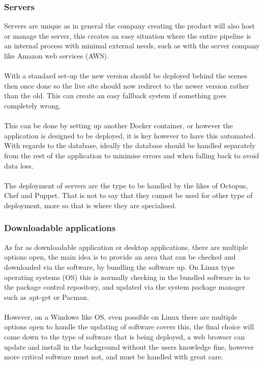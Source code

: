 \subsubsection{Servers}

Servers are unique as in general the company creating the product will also host or manage the server, this creates an easy situation where the entire pipeline is an internal process with minimal external needs, such as with the server company like Amazon web services (AWS).
\\\\
With a standard set-up the new version should be deployed behind the scenes then once done so the live site should now redirect to the newer version rather than the old. This can create an easy fallback system if something goes completely wrong.
\\\\
This can be done by setting up another Docker container, or however the application is designed to be deployed, it is key however to have this automated. With regards to the database, ideally the database should be handled separately from the rest of the application to minimise errors and when falling back to avoid data loss.
\\\\
The deployment of servers are the type to be handled by the likes of Octopus, Chef and Puppet. That is not to say that they cannot be used for other type of deployment, more so that is where they are specialised.

\subsubsection{Downloadable applications}

As far as downloadable application or desktop applications, there are multiple options open, the main idea is to provide an area that can be checked and downloaded via the software, by bundling the software up. On Linux type operating systems (OS) this is normally checking in the bundled software in to the package control repository, and updated via the system package manager such as apt-get or Pacman. 
\\\\
However, on a Windows like OS, even possible on Linux there are multiple options open to handle the updating of software \cite{deploy} covers this, the final choice will come down to the type of software that is being deployed, a web browser can update and install in the background without the users knowledge fine, however more critical software must not, and must be handled with great care.

